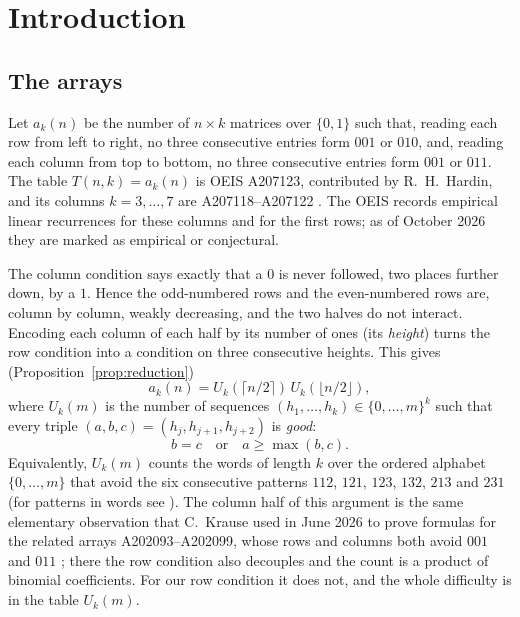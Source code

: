 \documentclass[11pt]{amsart}
\theoremstyle{definition}
\begin{document}
\maketitle

\section{Introduction}\label{sec:intro}

\subsection{The arrays}
Let $a_k(n)$ be the number of $n\times k$ matrices over $\{0,1\}$ such that, reading each row from left to right, no three consecutive entries form $001$ or $010$, and, reading each column from top to bottom, no three consecutive entries form $001$ or $011$. The table $T(n,k)=a_k(n)$ is OEIS A207123, contributed by R.~H.~Hardin, and its columns $k=3,\dots,7$ are A207118--A207122 \cite{OEIS}. The OEIS records empirical linear recurrences for these columns and for the first rows; as of October 2026 they are marked as empirical or conjectural.

The column condition says exactly that a $0$ is never followed, two places further down, by a $1$. Hence the odd-numbered rows and the even-numbered rows are, column by column, weakly decreasing, and the two halves do not interact. Encoding each column of each half by its number of ones (its \emph{height}) turns the row condition into a condition on three consecutive heights. This gives (Proposition~\ref{prop:reduction})
\begin{equation}\label{eq:reduction}
  a_k(n)=U_k(\lceil n/2\rceil)\,U_k(\lfloor n/2\rfloor),
\end{equation}
where $U_k(m)$ is the number of sequences $(h_1,\dots,h_k)\in\{0,\dots,m\}^k$ such that every triple $(a,b,c)=(h_j,h_{j+1},h_{j+2})$ is \emph{good}:
\[
  b=c\quad\text{or}\quad a\ge\max(b,c).
\]
Equivalently, $U_k(m)$ counts the words of length $k$ over the ordered alphabet $\{0,\dots,m\}$ that avoid the six consecutive patterns $112$, $121$, $123$, $132$, $213$ and $231$ (for patterns in words see \cite{Kitaev}). The column half of this argument is the same elementary observation that C.~Krause used in June 2026 to prove formulas for the related arrays A202093--A202099, whose rows and columns both avoid $001$ and $011$ \cite{Krause}; there the row condition also decouples and the count is a product of binomial coefficients. For our row condition it does not, and the whole difficulty is in the table $U_k(m)$.
\end{document}
